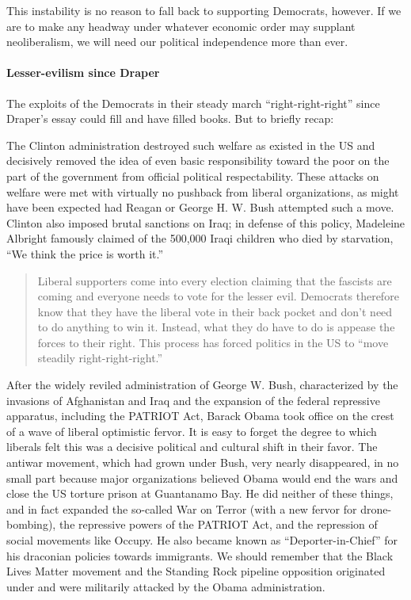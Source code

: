 This instability is no reason to fall back to supporting Democrats, however. If we are to make any headway under whatever economic order may supplant neoliberalism, we will need our political independence more than ever.

\paragraph{Lesser-evilism since Draper}

The exploits of the Democrats in their steady march ``right-right-right'' since Draper's essay could fill and have filled books. But to briefly recap:

The Clinton administration destroyed such welfare as existed in the US and decisively removed the idea of even basic responsibility toward the poor on the part of the government from official political respectability. These attacks on welfare were met with virtually no pushback from liberal organizations, as might have been expected had Reagan or George H. W. Bush attempted such a move. Clinton also imposed brutal sanctions on Iraq; in defense of this policy, Madeleine Albright famously claimed of the 500,000 Iraqi children who died by starvation, ``We think the price is worth it.''

\blockquote{Liberal supporters come into every election claiming that the fascists are coming and everyone needs to vote for the lesser evil. Democrats therefore know that they have the liberal vote in their back pocket and don't need to do anything to win it. Instead, what they do have to do is appease the forces to their right. This process has forced politics in the US to ``move steadily right-right-right.''}

After the widely reviled administration of George W. Bush, characterized by the invasions of Afghanistan and Iraq and the expansion of the federal repressive apparatus, including the PATRIOT Act, Barack Obama took office on the crest of a wave of liberal optimistic fervor. It is easy to forget the degree to which liberals felt this was a decisive political and cultural shift in their favor. The antiwar movement, which had grown under Bush, very nearly disappeared, in no small part because major organizations believed Obama would end the wars and close the US torture prison at Guantanamo Bay. He did neither of these things, and in fact expanded the so-called War on Terror (with a new fervor for drone-bombing), the repressive powers of the PATRIOT Act, and the repression of social movements like Occupy. He also became known as ``Deporter-in-Chief'' for his draconian policies towards immigrants. We should remember that the Black Lives Matter movement and the Standing Rock pipeline opposition originated under and were militarily attacked by the Obama administration.

